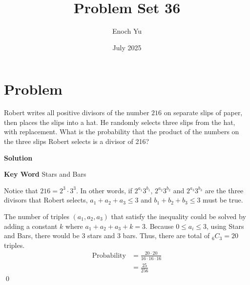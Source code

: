 \documentclass{article}
\title{Problem Set 36}
\author{Enoch Yu}
\date{July 2025}
\newenvironment{solution}{\begin{trivlist}\item[]{\bf Solution}}{\qed \end{trivlist}}
\begin{document}
\section*{Problem}
Robert writes all positive divisors of the number $216$ on separate slips of paper, then places the slips into a hat. He randomly selects three slips from the hat, with replacement. What is the probability that the product of the numbers on the three slips Robert selects is a divisor of 216?
\begin{solution}

\textbf{Key Word} Stars and Bars

Notice that $216 = 2^3 \cdot 3^3$. In other words, if $2^{a_1}3^{b_1}$, $2^{a_2}3^{b_2}$ and $2^{a_3}3^{b_3}$ are the three divisors that Robert selects, $a_1 + a_2 + a_3 \leq 3$ and $b_1 + b_2 + b_3 \leq 3$ must be true.

The number of triples $(a_1, a_2, a_3)$ that satisfy the inequality could be solved by adding a constant $k$ where $a_1 + a_2 + a_3 + k = 3$. Because $0 \leq a_i \leq 3$, using Stars and Bars, there would be $3$ stars and $3$ bars. Thus, there are total of ${}_6C_3 = 20$ triples.
\begin{align*}
    \text{Probability}
    &= \frac{20 \cdot 20}{16 \cdot 16 \cdot 16} \\
    &= \boxed{\frac{25}{256}}
\end{align*}
\end{solution}
\end{document}

